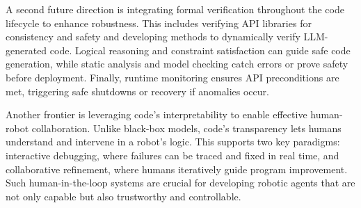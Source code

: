 \documentclass[10pt, a4paper, logo, copyright]{googledeepmind} %
\begin{document}
A second future direction is integrating formal verification throughout the code lifecycle to enhance robustness. This includes verifying API libraries for consistency and safety and developing methods to dynamically verify LLM-generated code. Logical reasoning and constraint satisfaction can guide safe code generation, while static analysis and model checking catch errors or prove safety before deployment. Finally, runtime monitoring ensures API preconditions are met, triggering safe shutdowns or recovery if anomalies occur.

Another frontier is leveraging code’s interpretability to enable effective human-robot collaboration. Unlike black-box models, code’s transparency lets humans understand and intervene in a robot’s logic. This supports two key paradigms: interactive debugging, where failures can be traced and fixed in real time, and collaborative refinement, where humans iteratively guide program improvement. Such human-in-the-loop systems are crucial for developing robotic agents that are not only capable but also trustworthy and controllable.


\end{document}
